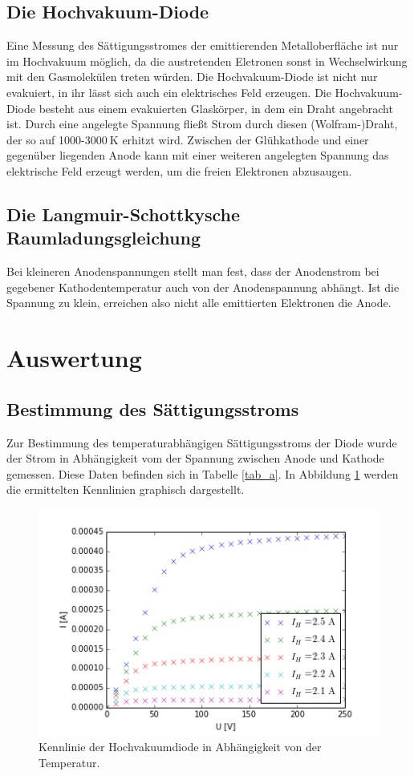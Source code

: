 \documentclass[11pt,ngerman,a4paper]{article}
\begin{document}
\subsection{Die Hochvakuum-Diode}
Eine Messung des Sättigungsstromes der emittierenden Metalloberfläche ist nur im Hochvakuum möglich, da die austretenden Eletronen sonst in Wechselwirkung mit den Gasmolekülen treten würden. Die Hochvakuum-Diode ist nicht nur evakuiert, in ihr lässt sich auch ein elektrisches Feld erzeugen.\newline
Die Hochvakuum-Diode besteht aus einem evakuierten Glaskörper, in dem ein Draht angebracht ist. Durch eine angelegte Spannung fließt Strom durch diesen (Wolfram-)Draht, der so auf 1000-$\SI{3000}{\kelvin}$ erhitzt wird. Zwischen der Glühkathode und einer gegenüber liegenden Anode kann mit einer weiteren angelegten Spannung das elektrische Feld erzeugt werden, um die freien Elektronen abzusaugen.
\subsection{Die Langmuir-Schottkysche Raumladungsgleichung}
Bei kleineren Anodenspannungen stellt man fest, dass der Anodenstrom bei gegebener Kathodentemperatur auch von der Anodenspannung abhängt. Ist die Spannung zu klein, erreichen also nicht alle emittierten Elektronen die Anode. 
\section{Auswertung}
\subsection{Bestimmung des Sättigungsstroms}
Zur Bestimmung des temperaturabhängigen Sättigungsstroms der Diode wurde der Strom in Abhängigkeit vom der Spannung zwischen Anode und Kathode gemessen. Diese Daten befinden sich in Tabelle \ref{tab_a}. In Abbildung \ref{abb_a} werden die ermittelten Kennlinien graphisch dargestellt. 
\begin{figure}[htp]
\centering
\includegraphics[scale=0.8]{plot_a.png}
\caption{Kennlinie der Hochvakuumdiode in Abhängigkeit von der Temperatur.}
\label{abb_a}
\end{figure}
\end{document}
